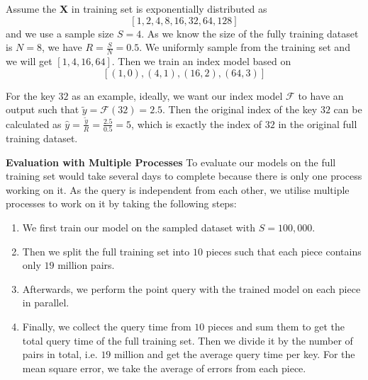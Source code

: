 \begin{mscexample}
	\label{mscexample:sampled_training}
	Assume the \textbf{X} in training set is exponentially distributed as $$[1,2,4,8,16,32,64,128]$$ and we use a sample size $S=4$. As we know the size of the fully training dataset is $N=8$, we have $R=\frac{S}{N}=0.5$. We uniformly sample from the training set and we will get $[1,4,16,64]$. Then we train an index model based on $$[(1,0), (4,1), (16,2), (64,3)]$$ 
	
	For the key $32$ as an example, ideally, we want our index model $\mathcal{F}$ to have an output such that $\tilde{y}=\mathcal{F}(32)=2.5$. Then the original index of the key $32$ can be calculated as $\hat{y}=\frac{\tilde{y}}{R}=\frac{2.5}{0.5}=5$, which is exactly the index of $32$ in the original full training dataset.
\end{mscexample}


\textbf{Evaluation with Multiple Processes} To evaluate our models on the full training set would take several days to complete because there is only one process working on it. As the query is independent from each other, we utilise multiple processes to work on it by taking the following steps:

\begin{enumerate}
	\item We first train our model on the sampled dataset with $S=100,000$.
	\item Then we split the full training set into $10$ pieces such that each piece contains only $19$ million pairs.
	\item Afterwards, we perform the point query with the trained model on each piece in parallel.
	\item Finally, we collect the query time from $10$ pieces and sum them to get the total query time of the full training set. Then we divide it by the number of pairs in total, i.e. $19$ million and get the average query time per key. For the mean square error, we take the average of errors from each piece.
\end{enumerate}
















